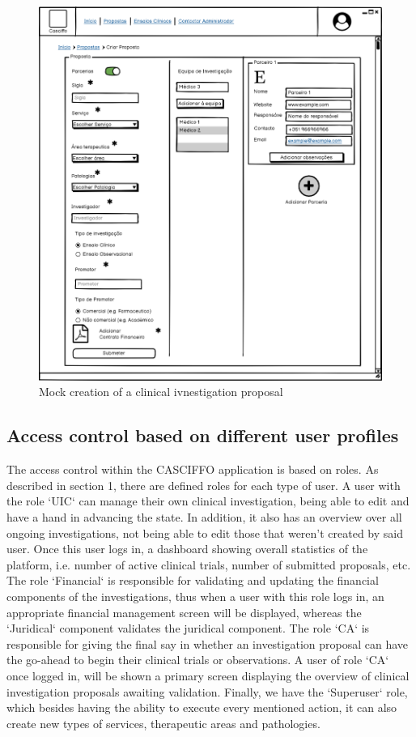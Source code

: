 \begin{figure}
    \centering
    \includegraphics{images/criar-proposta.png}
    \caption{Mock creation of a clinical ivnestigation proposal}
    \label{fig:criar-proposta}
\end{figure}

\subsection{Access control based on different user profiles}
The access control within the CASCIFFO application is based on roles.
As described in section 1, there are defined roles for each type of user.  
A user with the role `UIC` can manage their own clinical investigation, being able to edit and have a hand in advancing the state. In addition, it also has an overview over all ongoing investigations, not being able to edit those that weren't created by said user. Once this user logs in, a dashboard showing overall statistics of the platform, i.e. number of active clinical trials, number of submitted proposals, etc.
The role `Financial` is responsible for validating and updating the financial components of the investigations, thus when a user with this role logs in, an appropriate financial management screen will be displayed, whereas the `Juridical` component validates the juridical component.  
The role `CA` is responsible for giving the final say in whether an investigation proposal can have the go-ahead to begin their clinical trials or observations.  
A user of role `CA` once logged in, will be shown a primary screen displaying the overview of clinical investigation proposals awaiting validation.
Finally, we have the `Superuser` role, which besides having the ability to execute every mentioned action, it can also create new types of services, therapeutic areas and pathologies.


